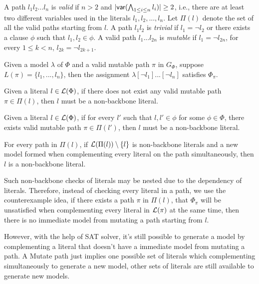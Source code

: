 A path $l_1l_2...l_n$ is \emph{valid} if $n>2$ and $|\textsf{var}(\bigwedge_{1\leq i\leq n} l_i)|\geq 2$, i.e., there are at least two different variables used in
the literals  $l_1,l_2,...,l_n$. Let $\Pi(l)$ denote the set of all the valid paths starting from $l$.
A path $l_1l_2$ is \emph{trivial} if $l_1=\neg l_2$ or there exists a clause $\phi$ such that $l_1,l_2\in\phi$.
A valid path $l_1...l_{2n}$ is \emph{mutable} if $l_1=\neg l_{2n}$, for every $1\leq k < n$, $l_{2k}=\neg l_{2k+1}$.

\begin{proposition}
Given a model $\lambda$ of $\Phi$ and a valid mutable path $\pi$ in $G_\Phi$, 
suppose $L(\pi)=\{l_1,...,l_n\}$,  then the assignment $\lambda[\neg l_1]...[\neg l_n]$ satisfies $\Phi_\pi$.
\end{proposition}
 
Given a literal $l\in {\cal L}(\Phi)$, if there does not exist any valid mutable path $\pi\in\Pi(l)$, then $l$ must be a non-backbone literal.


Given a literal $l\in {\cal L}(\Phi)$, if for every $l'$ such that $l,l'\in \phi$ for some $\phi\in\Phi$,
there exists valid mutable path $\pi\in\Pi(l')$, then $l$ must be a non-backbone literal.
  
 
 For every path in $\Pi(l)$, if ${\cal L}(\Pi(l))\setminus\{l\}$ is non-backbone literals and a new model formed when complementing every literal on the path simultaneously, then $l$ is a non-backbone literal.

 Such non-backbone checks of literals may be nested due to the dependency of literals. Therefore, instead of checking every literal in a path, we use the counterexample idea, if there exists a path $\pi$ in $\Pi(l)$, that $\Phi_{\pi}$ will be unsatisfied when complementing every literal in ${\cal L}(\pi)$ at the same time, then there is no immediate model from mutating a path starting from $l$.

 However, with the help of SAT solver, it's still possible to generate a model by complementing a literal that doesn't have a immediate model from mutating a path. A Mutate path just implies one possible set of literals which complementing simultaneously to generate a new model, other sets of literals are still available to generate new models.

